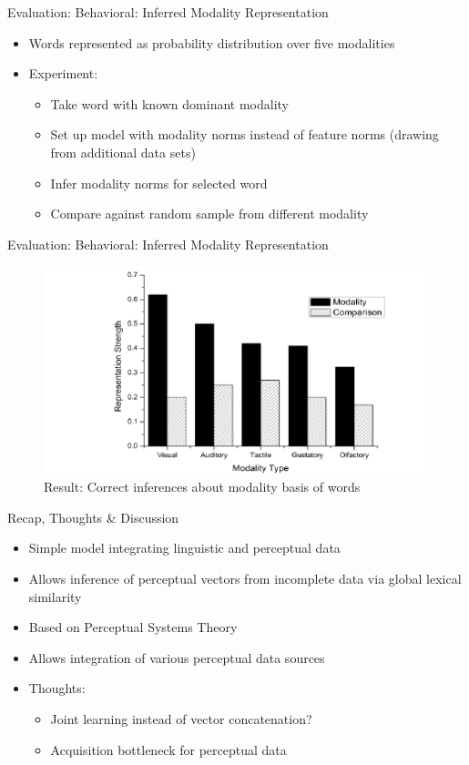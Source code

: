 \documentclass[12pt,a4paper]{beamer}
\begin{document}
\begin{frame}{Evaluation: Behavioral: Inferred Modality Representation}
\begin{itemize}
\item Words represented as probability distribution over five modalities
\item Experiment:
    \begin{itemize}
    \item Take word with known dominant modality
    \item Set up model with modality norms instead of feature norms (drawing from additional data sets)
    \item Infer modality norms for selected word
    \item Compare against random sample from different modality
    \end{itemize}
\end{itemize}
\end{frame}

\begin{frame}{Evaluation: Behavioral: Inferred Modality Representation}
\begin{figure}
\includegraphics[scale=0.7]{figure_5_level_of_strength_for_different_modalities.png}
\caption{Result: Correct inferences about modality basis of words}
\end{figure}
\end{frame}



\begin{frame}{Recap, Thoughts \& Discussion}
\begin{itemize}
\item Simple model integrating linguistic and perceptual data
\item Allows inference of perceptual vectors from incomplete data via global lexical similarity
\item Based on Perceptual Systems Theory
\item Allows integration of various perceptual data sources
\item Thoughts:
    \begin{itemize}
    \item Joint learning instead of vector concatenation?
    \item Acquisition bottleneck for perceptual data
    \end{itemize}
\end{itemize}
\end{frame}
\end{document}
